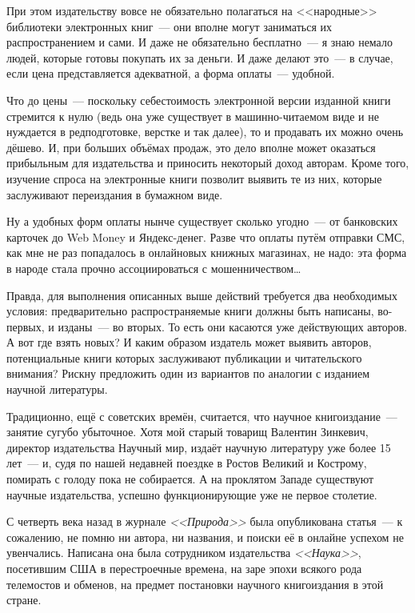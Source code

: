 При этом издательству вовсе не обязательно полагаться на <<народные>> библиотеки электронных книг~--- они вполне могут заниматься их распространением и сами. И даже не обязательно бесплатно~--- я знаю немало людей, которые готовы покупать их за деньги. И даже делают это~--- в случае, если цена представляется адекватной, а форма оплаты~--- удобной.

Что до цены~--- поскольку себестоимость электронной версии изданной книги стремится к нулю (ведь она уже существует в машинно-читаемом виде и не нуждается в редподготовке, верстке и так далее), то и продавать их можно очень дёшево. И, при больших объёмах продаж, это дело вполне может оказаться прибыльным для издательства и приносить некоторый доход авторам. Кроме того, изучение спроса на электронные книги позволит выявить те из них, которые заслуживают переиздания в бумажном виде.

Ну а удобных форм оплаты нынче существует сколько угодно~--- от банковских карточек до Web Money и Яндекс-денег. Разве что оплаты путём отправки СМС, как мне не раз попадалось в онлайновых книжных магазинах, не надо: эта форма в народе стала прочно ассоциироваться с мошенничеством\dots

Правда, для выполнения описанных выше действий требуется два необходимых условия: предварительно распространяемые книги должны быть написаны, во-первых, и изданы~--- во вторых. То есть они касаются уже действующих авторов. А вот где взять новых? И каким образом издатель может выявить авторов, потенциальные  книги которых заслуживают публикации и читательского внимания? Рискну предложить один из вариантов по аналогии с изданием научной литературы.

Традиционно, ещё с советских времён, считается, что научное книгоиздание~--- занятие сугубо убыточное. Хотя мой старый товарищ Валентин Зинкевич, директор издательства Научный мир, издаёт научную литературу уже более 15 лет~--- и, судя по нашей недавней поездке в Ростов Великий и Кострому, помирать с голоду пока не собирается. А на проклятом Западе существуют научные издательства, успешно функционирующие уже не первое столетие.

С четверть века назад в журнале \textit{<<Природа>>} была опубликована статья~--- к сожалению, не помню ни автора, ни названия, и поиски её в онлайне успехом не увенчались. Написана она была сотрудником издательства \textit{<<Наука>>}, посетившим США в перестроечные времена, на заре эпохи всякого рода телемостов и обменов, на предмет постановки научного книгоиздания в этой стране.

